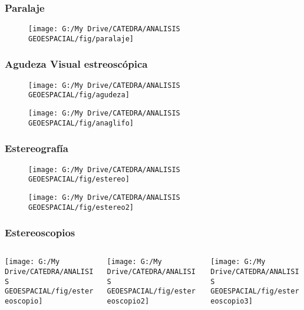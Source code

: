 \documentclass[14pt]{beamer}
\begin{document}
\begin{frame}
\frametitle{Paralaje}
 \begin{figure}
    \centering
    \texttt{[image: G:/My Drive/CATEDRA/ANALISIS GEOESPACIAL/fig/paralaje]}
  \end{figure}
\end{frame}
\begin{frame}
 \frametitle{Agudeza Visual estreoscópica}
 \begin{figure}
    \centering
    \texttt{[image: G:/My Drive/CATEDRA/ANALISIS GEOESPACIAL/fig/agudeza]}
  \end{figure}
\end{frame}
\begin{frame}
 \begin{figure}
    \centering
    \texttt{[image: G:/My Drive/CATEDRA/ANALISIS GEOESPACIAL/fig/anaglifo]}
  \end{figure}
\end{frame}
\begin{frame}
\frametitle{Estereografía} 
 \begin{figure}
    \centering
    \texttt{[image: G:/My Drive/CATEDRA/ANALISIS GEOESPACIAL/fig/estereo]}
  \end{figure}
\end{frame}
\begin{frame}
 \begin{figure}
    \centering
    \texttt{[image: G:/My Drive/CATEDRA/ANALISIS GEOESPACIAL/fig/estereo2]}
  \end{figure}
\end{frame}
\begin{frame}
\frametitle{Estereoscopios}
  \begin{columns}
		\begin{column}{.3\linewidth}
		 \texttt{[image: G:/My Drive/CATEDRA/ANALISIS GEOESPACIAL/fig/estereoscopio]}
		\end{column}
		\begin{column}{.3\linewidth}
\texttt{[image: G:/My Drive/CATEDRA/ANALISIS GEOESPACIAL/fig/estereoscopio2]}
		\end{column}
		\begin{column}{.3\linewidth}
\texttt{[image: G:/My Drive/CATEDRA/ANALISIS GEOESPACIAL/fig/estereoscopio3]}
		\end{column}
	\end{columns}
\end{frame}
\end{document}
